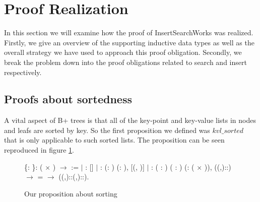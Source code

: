 \section{Proof Realization}
\label{sec:ProofRealization}
In this section we will examine how the proof of InsertSearchWorks was realized. Firstly, we give an overview of the supporting inductive data types as well as the overall strategy we have used to approach this proof obligation. Secondly, we break the problem down into the proof obligations related to search and insert respectively. 

\subsection{Proofs about sortedness}
A vital aspect of B+ trees is that all of the key-point and key-value lists in nodes and leafs are sorted by key. So the first proposition we defined was $kvl\_sorted$ that is only applicable to such sorted lists. The proposition can be seen reproduced in figure \ref{fig:kvl_sorted}.

\begin{figure}
  \begin{coqdoccode}
  \coqdocnoindent
    \{: \}:  ( \ensuremath{\times} ) \ensuremath{\rightarrow}  :=\coqdoceol
  \coqdocindent{1.00em}
  \ensuremath{|}
  :  []\coqdoceol
  \coqdocindent{1.00em}
  \ensuremath{|} : \coqdockw{\ensuremath{\forall}} (: ) (: ), \coqdoceol
  \coqdocindent{8.00em}
   [(, )]\coqdoceol
  \coqdocindent{1.00em}
  \ensuremath{|} : \coqdockw{\ensuremath{\forall}} ( : ) ( : ) (:  ( \ensuremath{\times} )), \coqdoceol
  \coqdocindent{8.00em}
   ((,)::) \ensuremath{\rightarrow} \coqdoceol
  \coqdocindent{8.00em}
     =  \ensuremath{\rightarrow}\coqdoceol
  \coqdocindent{8.00em}
   ((,)::(,)::).\coqdoceol
  \end{coqdoccode}
  \caption{Our proposition about sorting}
  \label{fig:kvl_sorted}
\end{figure}

